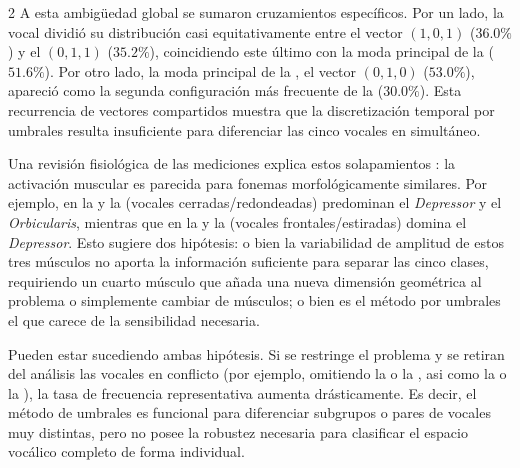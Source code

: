 \documentclass[11pt, letterpaper]{article}
\begin{document}
\begin{multicols*}{2}
A esta ambigüedad global se sumaron cruzamientos específicos. Por un lado, la vocal  dividió su distribución casi equitativamente entre el vector $(1, 0, 1)$ ($36.0\%$) y el $(0, 1, 1)$ ($35.2\%$), coincidiendo este último con la moda principal de la  ($51.6\%$). Por otro lado, la moda principal de la , el vector $(0, 1, 0)$ ($53.0\%$), apareció como la segunda configuración más frecuente de la  ($30.0\%$). Esta recurrencia de vectores compartidos muestra que la discretización temporal por umbrales resulta insuficiente para diferenciar las cinco vocales en simultáneo. 



Una revisión fisiológica de las mediciones explica estos solapamientos \cite{ipa1999}: la activación muscular es parecida para fonemas morfológicamente similares. Por ejemplo, en la  y la  (vocales cerradas/redondeadas) predominan el \textit{Depressor} y el \textit{Orbicularis}, mientras que en la  y la  (vocales frontales/estiradas) domina el \textit{Depressor}. Esto sugiere dos hipótesis: o bien la variabilidad de amplitud de estos tres músculos no aporta la información suficiente para separar las cinco clases, requiriendo un cuarto músculo que añada una nueva dimensión geométrica al problema o simplemente cambiar de músculos; o bien es el método por umbrales el que carece de la sensibilidad necesaria.

Pueden estar sucediendo ambas hipótesis. Si se restringe el problema y se retiran del análisis las vocales en conflicto (por ejemplo, omitiendo la  o la , asi como la  o la ), la tasa de frecuencia representativa aumenta drásticamente. Es decir, el método de umbrales es funcional para diferenciar subgrupos o pares de vocales muy distintas, pero no posee la robustez necesaria para clasificar el espacio vocálico completo de forma individual.


\end{multicols*}
\end{document}
